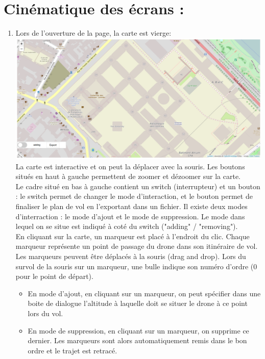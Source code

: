 \documentclass{article}
\begin{document}
\section{Cinématique des écrans :}

 \begin{enumerate}
 \item Lors de l'ouverture de la page, la carte est vierge:\\
 \includegraphics[scale=0.42]{capt1.PNG}\\
 La carte est interactive et on peut la déplacer avec la souris.
  Les boutons situés en haut à gauche permettent de zoomer et dézoomer sur la carte.\\
 Le cadre situé en bas à gauche contient un switch (interrupteur) et un bouton : le switch permet de changer le mode d'interaction, et le bouton permet de finaliser le plan de vol en l'exportant dans un fichier.
 Il existe deux modes d'interraction :  le mode d'ajout et le mode de suppression. Le mode dans lequel on se situe est indiqué à coté du switch ("adding" / "removing").\\
  En cliquant sur la carte, un marqueur est placé à l'endroit du clic. Chaque marqueur représente un point de passage du drone dans son itinéraire de vol. Les marqueurs peuvent être déplacés à la souris (drag and drop). Lors du survol de la souris sur un marqueur, une bulle indique son numéro d'ordre (0 pour le point de départ).
  \begin{itemize}
 \item En mode d'ajout, en cliquant sur un marqueur, on peut spécifier dans une boite de dialogue l'altitude à laquelle doit se situer le drone à ce point lors du vol.
 \item En mode de suppression, en cliquant sur un marqueur, on supprime ce dernier. Les marqueurs sont alors automatiquement remis dans le bon ordre et le trajet est retracé.
 \end{itemize}
    \medbreak
   

\end{enumerate}
\end{document}
